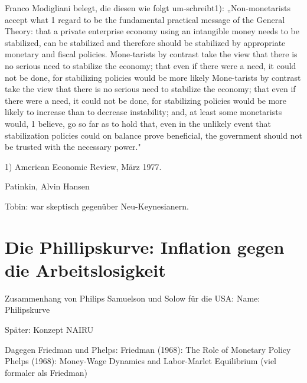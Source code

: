 Franco Modigliani belegt, die diesen wie folgt um-schreibt1): „Non-monetarists accept what 1 regard to be the fundamental practical message of the General Theory: that a private enterprise economy using an intangible money needs to be stabilized, can be stabilized and therefore should be stabilized by appropriate monetary and fiscal policies. Mone-tarists by contrast take the view that there is no serious need to stabilize the economy; that even if there were a need, it could not be done, for stabilizing policies would be more likely
Mone-tarists by contrast take the view that there is no serious need to stabilize the economy; that even if there were a need, it could not be done, for stabilizing policies would be more likely to increase than to decrease instability; and, at least some monetarists would, 1 believe, go so far as to hold that, even in the unlikely event that stabilization policies could on balance prove beneficial, the government should not be trusted with the necessary power."

1) American Economic Review, März 1977.

Patinkin, Alvin Hansen

Tobin: war skeptisch gegenüber Neu-Keynesianern. \textcite[S. 398]{Snowdon2005}

\section{Die Phillipskurve: Inflation gegen die Arbeitslosigkeit} \label{sec: Phillips}

Zusammenhang von Philips
Samuelson und Solow für die USA: Name: Philipskurve


Später: Konzept NAIRU


Dagegen Friedman und Phelps:
Friedman (1968): The Role of Monetary Policy
Phelps (1968): Money-Wage Dynamics and Labor-Marlet Equilibrium (viel formaler als Friedman)



